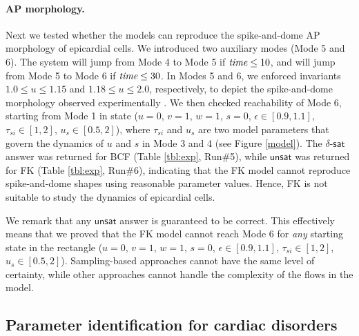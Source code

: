 \paragraph{AP morphology.}
Next we tested whether the models can reproduce the spike-and-dome AP morphology of epicardial cells. We introduced two auxiliary modes (Mode 5 and 6). The system will jump from Mode 4 to Mode 5 if $\text{\em time} \le 10$, and will jump from Mode 5 to Mode 6 if $\text{\em time} \le 30$. In Modes 5 and 6, we enforced invariants $1.0 \le u \le 1.15$ and $1.18 \le u \le 2.0$, respectively, to depict the spike-and-dome morphology observed experimentally \cite{nabauer96}. We then checked reachability of Mode 6, starting from Mode 1 in state ($u = 0$, $v = 1$, $w = 1$, $s = 0$, $\epsilon \in [0.9,1.1]$, $\tau_{si} \in [1,2]$, $u_s \in [0.5,2]$),
where $\tau_{si}$ and $u_s$ are two model parameters that govern the dynamics of $u$ and $s$ in
Mode 3 and 4 (see Figure \ref{model}).
The $\delta$-$\mathsf{sat}$ answer
was returned for BCF  (Table \ref{tbl:exp}, Run\#5), while $\mathsf{unsat}$ was returned for FK (Table \ref{tbl:exp}, Run\#6), indicating that the FK model cannot reproduce spike-and-dome shapes using reasonable parameter values. Hence, FK is not suitable to study the dynamics of epicardial cells.

We remark that any $\mathsf{unsat}$ answer is guaranteed to be correct. This effectively
means that we proved that the FK model cannot reach Mode 6 for {\em any} starting state in the
rectangle ($u = 0$, $v = 1$, $w = 1$, $s = 0$, $\epsilon \in [0.9,1.1]$, $\tau_{si} \in [1,2]$,
$u_s \in [0.5,2]$). Sampling-based approaches cannot have the same level of certainty, while other
approaches cannot handle the complexity of the flows in the model.


\subsection{Parameter identification for cardiac disorders}

